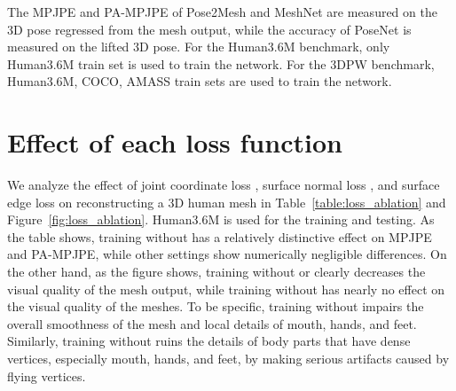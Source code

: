 \documentclass[runningheads]{llncs}
\begin{document}
The MPJPE and PA-MPJPE of Pose2Mesh and MeshNet are measured on the 3D pose regressed from the mesh output, while the accuracy of PoseNet is measured on the lifted 3D pose.
For the Human3.6M benchmark, only Human3.6M train set is used to train the network.
For the 3DPW benchmark, Human3.6M, COCO, AMASS train sets are used to train the network. 

\begin{table}[!hbt]
\setlength{\tabcolsep}{1pt}
\def\arraystretch{1.1}
\centering
\caption{The upper bounds of Pose2Mesh, PoseNet, and MeshNet on Human3.6m and 3DPW benchmarks.}
\label{table:upper_bound}
\end{table}




\section{Effect of each loss function}
We analyze the effect of joint coordinate loss , surface normal loss , and surface edge loss  on reconstructing a 3D human mesh in Table~\ref{table:loss_ablation} and Figure~\ref{fig:loss_ablation}.
Human3.6M is used for the training and testing.
As the table shows, training without  has a relatively distinctive effect on MPJPE and PA-MPJPE, while other settings show numerically negligible differences.
On the other hand, as the figure shows, training without  or  clearly decreases the visual quality of the mesh output, while training without  has nearly no effect on the visual quality of the meshes.
To be specific, training without  impairs the overall smoothness of the mesh and local details of mouth, hands, and feet.
Similarly, training without  ruins the details of body parts that have dense vertices, especially mouth, hands, and feet, by making serious artifacts caused by flying vertices.
\end{document}
